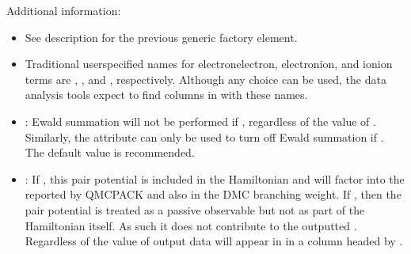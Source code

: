 \documentclass[letterpaper,10pt,english]{sphinxmanual}
\begin{document}
Additional information:
\begin{itemize}
\item {} 
 See description for the previous generic
 factory element.

\item {} 
 Traditional user\sphinxhyphen{}specified names for electron\sphinxhyphen{}electron,
electron\sphinxhyphen{}ion, and ion\sphinxhyphen{}ion terms are , , and
, respectively. Although any choice can be used, the data
analysis tools expect to find columns in  with these
names.

\item {} 
: Ewald summation will not be performed if
, regardless of the value of
. Similarly, the  attribute can only be used to turn
off Ewald summation if . The default
value is recommended.

\item {} 
: If , this pair potential is included
in the Hamiltonian and will factor into the  reported
by QMCPACK and also in the DMC branching weight. If ,
then the pair potential is treated as a passive observable but not as
part of the Hamiltonian itself. As such it does not contribute to the
outputted . Regardless of the value of 
output data will appear in  in a column headed by
.

\end{itemize}
\def\sphinxLiteralBlockLabel{\label{\detokenize{hamiltonianobservable:listing-16}}}
\begin{sphinxVerbatim}[commandchars=\\\{\}]
    
\end{sphinxVerbatim}
\end{document}

